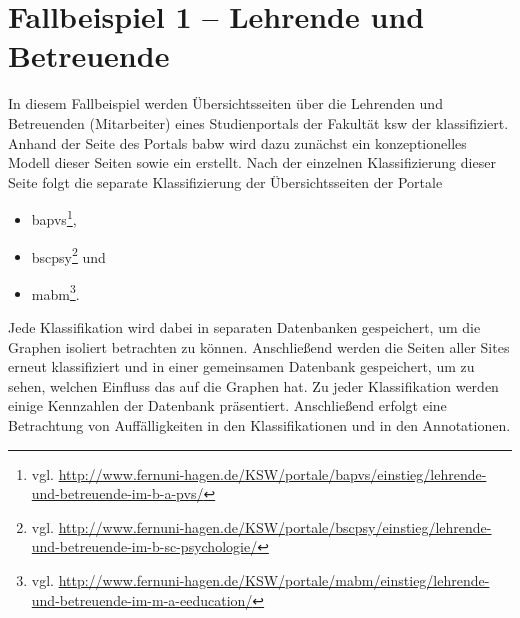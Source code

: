 \section{Fallbeispiel 1 -- Lehrende und Betreuende}
    \label{section:findingsCaseStudy1}
    In diesem Fallbeispiel werden Übersichtsseiten
    über die Lehrenden und Betreuenden (Mitarbeiter) eines Studienportals
    der Fakultät \gls{ksw} der {\fernUni} klassifiziert.
    Anhand der Seite des Portals \gls{babw} wird dazu zunächst ein
    konzeptionelles Modell dieser Seiten sowie ein {\classificationModel} erstellt.
    Nach der einzelnen Klassifizierung dieser Seite folgt die separate Klassifizierung
    der Übersichtsseiten der Portale

    \begin{itemize}
        \item \gls{bapvs}\footnote{vgl. \url{http://www.fernuni-hagen.de/KSW/portale/bapvs/einstieg/lehrende-und-betreuende-im-b-a-pvs/}},
        \item \gls{bscpsy}\footnote{vgl. \url{http://www.fernuni-hagen.de/KSW/portale/bscpsy/einstieg/lehrende-und-betreuende-im-b-sc-psychologie/}} und
        \item \gls{mabm}\footnote{vgl. \url{http://www.fernuni-hagen.de/KSW/portale/mabm/einstieg/lehrende-und-betreuende-im-m-a-eeducation/}}.
    \end{itemize}

    Jede Klassifikation wird dabei in separaten Datenbanken gespeichert,
    um die Graphen isoliert betrachten zu können.
    Anschließend werden die Seiten aller Sites erneut klassifiziert und in
    einer gemeinsamen Datenbank gespeichert,
    um zu sehen, welchen Einfluss das auf die Graphen hat.
    Zu jeder Klassifikation werden einige Kennzahlen der Datenbank präsentiert.
    Anschließend erfolgt eine Betrachtung von Auffälligkeiten in den Klassifikationen und in den Annotationen.

    
    
    
    
    
    
    
    
